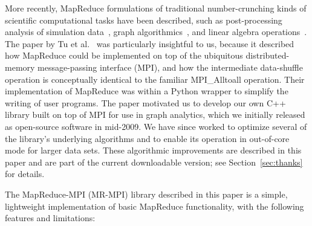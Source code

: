 More recently, MapReduce formulations of traditional number-crunching
kinds of scientific computational tasks have been described, such as
post-processing analysis of simulation data~\cite{Tu08}, graph
algorithmics~\cite{Cohen09,Kang09,Lin10}, and linear algebra
operations~\cite{Ekanayake09}.  The paper by Tu et
al.~\cite{Tu08} was particularly insightful to us, because it
described how MapReduce could be implemented on top of the ubiquitous
distributed-memory message-passing interface (MPI), and how the
intermediate data-shuffle operation is conceptually identical to the
familiar MPI\_Alltoall operation.  Their implementation of MapReduce
was within a Python wrapper to simplify the writing of user programs.
The paper motivated us to develop our own C++ library built on top of
MPI for use in graph analytics, which we initially released as
open-source software in mid-2009.  We have since worked to optimize
several of the library's underlying algorithms and to enable its
operation in out-of-core mode for larger data sets.  These algorithmic
improvements are described in this paper and are part of the current
downloadable version; see Section~\ref{sec:thanks} for details.

The MapReduce-MPI (MR-MPI) library described in this paper is a
simple, lightweight implementation of basic MapReduce functionality,
with the following features and limitations:


